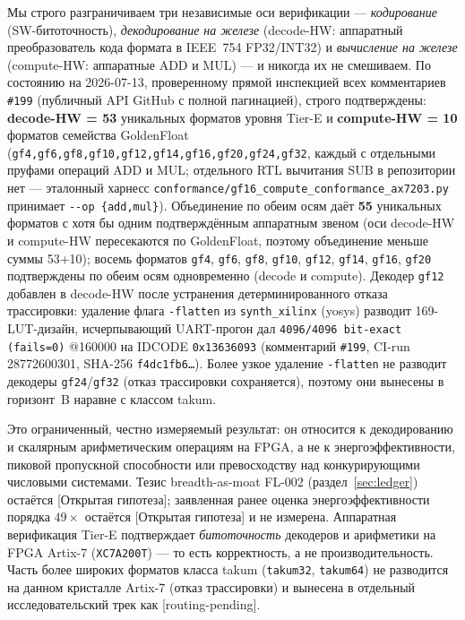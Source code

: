 \documentclass[11pt,a4paper]{article}
\theoremstyle{plain}
\begin{document}
Мы строго разграничиваем три независимые оси верификации ---
\emph{кодирование} (SW-битоточность), \emph{декодирование на железе}
(decode-HW: аппаратный преобразователь кода формата в IEEE~754 FP32/INT32)
и \emph{вычисление на железе} (compute-HW: аппаратные ADD и MUL) --- и
никогда их не смешиваем. По состоянию на 2026-07-13, проверенному прямой
инспекцией всех комментариев \texttt{\#199} (публичный API GitHub с
полной пагинацией), строго подтверждены:
\textbf{decode-HW = 53} уникальных форматов уровня Tier-E и
\textbf{compute-HW = 10} форматов семейства GoldenFloat
(\texttt{gf4,gf6,gf8,gf10,gf12,gf14,gf16,gf20,gf24,gf32}, каждый с
отдельными пруфами операций ADD и MUL; отдельного RTL вычитания SUB в
репозитории нет --- эталонный харнесс
\texttt{conformance/gf16\_compute\_conformance\_ax7203.py} принимает
\texttt{-{}-op \{add,mul\}}). Объединение по обеим осям даёт
\textbf{55} уникальных форматов с хотя бы одним подтверждённым аппаратным
звеном (оси decode-HW и compute-HW пересекаются по GoldenFloat, поэтому
объединение меньше суммы 53+10); восемь форматов
\texttt{gf4}, \texttt{gf6}, \texttt{gf8}, \texttt{gf10}, \texttt{gf12},
\texttt{gf14}, \texttt{gf16}, \texttt{gf20} подтверждены по обеим осям
одновременно (decode и compute). Декодер \texttt{gf12} добавлен в
decode-HW после устранения детерминированного отказа трассировки: удаление
флага \texttt{-flatten} из \texttt{synth\_xilinx} (yosys) разводит
169-LUT-дизайн, исчерпывающий UART-прогон дал
\texttt{4096/4096 bit-exact (fails=0)} @160000 на IDCODE
\texttt{0x13636093} (комментарий \texttt{\#199}, CI-run 28772600301,
SHA-256 \texttt{f4dc1fb6\dots}). Более узкое удаление \texttt{-flatten}
не разводит декодеры \texttt{gf24}/\texttt{gf32} (отказ трассировки
сохраняется), поэтому они вынесены в горизонт~B наравне с классом takum.

Это ограниченный, честно измеряемый результат: он относится к декодированию
и скалярным арифметическим операциям на FPGA, а не к энергоэффективности,
пиковой пропускной способности или превосходству над конкурирующими
числовыми системами. Тезис breadth-as-moat FL-002
(раздел~\ref{sec:ledger}) остаётся [Открытая гипотеза]; заявленная ранее
оценка энергоэффективности порядка \(49\times\) остаётся [Открытая
гипотеза] и не измерена. Аппаратная верификация Tier-E подтверждает
\emph{битоточность} декодеров и арифметики на FPGA
Artix-7 (\texttt{XC7A200T}) --- то есть корректность, а не производительность. Часть более
широких форматов класса takum (\texttt{takum32}, \texttt{takum64}) не
разводится на данном кристалле Artix-7 (отказ трассировки) и вынесена в
отдельный исследовательский трек как [routing-pending].
\end{document}
